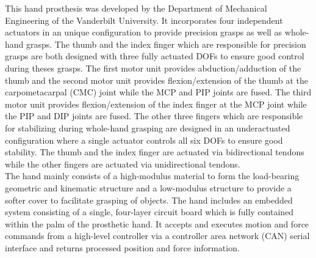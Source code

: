 \documentclass[a4paper, 10pt, conference]{ieeeconf}      %
\begin{document}
This hand prosthesis was developed by the Department of Mechanical Engineering of the Vanderbilt University. It incorporates four independent actuators in an unique configuration to provide precision grasps as well as whole-hand grasps. The thumb and the index finger which are responsible for precision grasps are both designed with three fully actuated DOFs to ensure good control during theses grasps. The first motor unit provides abduction/adduction of the thumb and the second motor unit provides flexion/extension of the thumb at the carpometacarpal (CMC) joint while the MCP and PIP joints are fused. The third motor unit provides flexion/extension of the index finger at the MCP joint while the PIP and DIP joints are fused. The other three fingers which are responsible for stabilizing during whole-hand grasping are designed in an underactuated configuration where a single actuator controls all six DOFs to ensure good stability. The thumb and the index finger are actuated via bidirectional tendons while the other fingers are actuated via unidirectional tendons.\\
The hand mainly consists of a high-modulus material to form the load-bearing geometric and kinematic structure and a low-modulus structure to provide a softer cover to facilitate grasping of objects. The hand includes an embedded system consisting of a single, four-layer circuit board which is fully contained within the palm of the prosthetic hand. It accepts and executes motion and force commands from a high-level controller via a controller area network (CAN) serial interface and returns processed position and force information.

\newpage~\newpage
\end{document}
